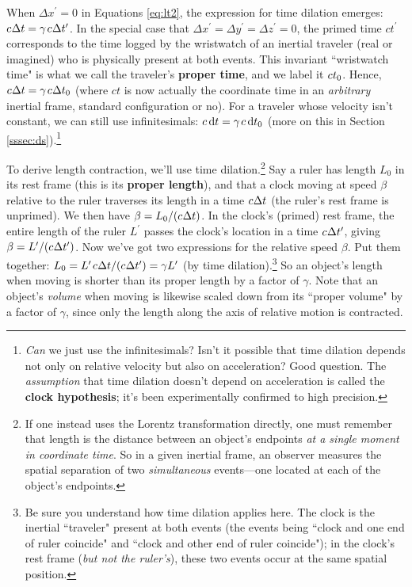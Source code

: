 \documentclass[12pt]{article}
\newcommand{\dd}[1]{\mathrm{d}#1}
\begin{document}
When $\Delta x^{\prime} = 0$ in Equations \ref{eq:lt2}, the expression for time dilation emerges: $c \mkern.5mu \Delta t = \gamma \mkern2mu c \mkern.5mu \Delta t^{\prime}$. In the special case that $\Delta x^{\prime} = \Delta y^{\prime} = \Delta z^{\prime} = 0$, the primed time $ct^{\prime}$ corresponds to the time logged by the wristwatch of an inertial traveler (real or imagined) who is physically present at both events. This invariant ``wristwatch time" is what we call the traveler's \textbf{proper time}, and we label it $c \mkern.5mu t_0$. Hence, $c \mkern.5mu \Delta t = \gamma \mkern2mu c \mkern.5mu \Delta t_0$ (where $ct$ is now actually the coordinate time in an \emph{arbitrary} inertial frame, standard configuration or no). For a traveler whose velocity isn't constant, we can still use infinitesimals: $c \, \dd t = \gamma \mkern2mu c \, \dd t_0$ (more on this in Section \ref{sssec:ds}).\footnote{\label{fn:ch}\emph{Can} we just use the infinitesimals? Isn't it possible that time dilation depends not only on relative velocity but also on acceleration? Good question. The \emph{assumption} that time dilation doesn't depend on acceleration is called the \textbf{clock hypothesis}; it's been experimentally confirmed to high precision.}

To derive length contraction, we'll use time dilation.\footnote{If one instead uses the Lorentz transformation directly, one must remember that length is the distance between an object's endpoints \emph{at a single moment in coordinate time}. So in a given inertial frame, an observer measures the spatial separation of two \emph{simultaneous} events---one located at each of the object's endpoints.} Say a ruler has length $L_0$ in its rest frame (this is its \textbf{proper length}), and that a clock moving at speed $\beta$ relative to the ruler traverses its length in a time $c \mkern.5mu \Delta t$ (the ruler's rest frame is unprimed). We then have $\beta = L_0 / (c \mkern.5mu \Delta t)$. In the clock's (primed) rest frame, the entire length of the ruler $L^\prime$ passes the clock's location in a time $c \mkern.5mu \Delta t^\prime$, giving $\beta = L^\prime / (c \mkern.5mu \Delta t^\prime)$. Now we've got two expressions for the relative speed $\beta$. Put them together: $L_0 = L^\prime \mkern2mu c \mkern.5mu \Delta t / (c \mkern.5mu \Delta t^\prime) = \gamma L^\prime$ (by time dilation).\footnote{Be sure you understand how time dilation applies here. The clock is the inertial ``traveler" present at both events (the events being ``clock and one end of ruler coincide" and ``clock and other end of ruler coincide"); in the clock's rest frame (\emph{but not the ruler's}), these two events occur at the same spatial position.} So an object's length when moving is shorter than its proper length by a factor of $\gamma$. Note that an object's \emph{volume} when moving is likewise scaled down from its ``proper volume" by a factor of $\gamma$, since only the length along the axis of relative motion is contracted.
\end{document}
